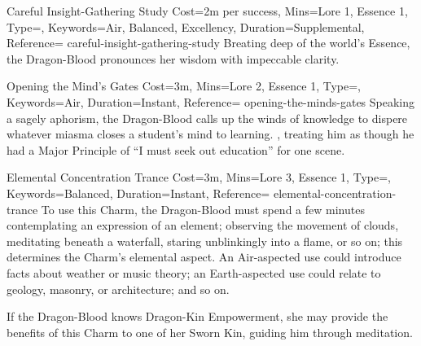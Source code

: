 
\begin{Charm}{Careful Insight-Gathering Study}{%
    Cost=2m per success,
    Mins={Lore 1, Essence 1},
    Type=\SupplementalType,
    Keywords={Air, Balanced, Excellency},
    Duration=Supplemental,
    Reference=\cite*[p.~214]{db}
}{careful-insight-gathering-study}
    Breating deep of the world's Essence, the Dragon-Blood pronounces her
    wisdom with impeccable clarity. 
\end{Charm}


\begin{Charm}{Opening the Mind's Gates}{%
    Cost=3m,
    Mins={Lore 2, Essence 1},
    Type=\SimpleType,
    Keywords=Air,
    Duration=Instant,
    Reference=\cite*[p~214]{db}
}{opening-the-minds-gates}
    Speaking a sagely aphorism, the Dragon-Blood calls up the winds of
    knowledge to dispere whatever miasma closes a student's mind to learning.
    ,
    treating him as though he had a Major Principle of ``I must seek out
    education'' for one scene. 
\end{Charm}


\begin{Charm}{Elemental Concentration Trance}{%
    Cost=3m,
    Mins={Lore 3, Essence 1},
    Type=\SimpleType,
    Keywords=Balanced,
    Duration=Instant,
    Reference=\cite*[p.~214]{db}
}{elemental-concentration-trance}
    To use this Charm, the Dragon-Blood must spend a few minutes contemplating
    an expression of an element; observing the movement of clouds, meditating
    beneath a waterfall, staring unblinkingly into a flame, or so on; this
    determines the Charm's elemental aspect.  An Air-aspected use
    could introduce facts about weather or music theory; an Earth-aspected use
    could relate to geology, masonry, or architecture; and so on.

    \begin{Unavailable}
        If the Dragon-Blood knows Dragon-Kin Empowerment, she may provide the
        benefits of this Charm to one of her Sworn Kin, guiding him through
        meditation.
    \end{Unavailable}
\end{Charm}



